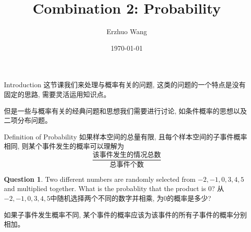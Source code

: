 \documentclass{beamer}
\title{Combination 2: Probability}
\institute{Youth STEM Academy}
\author{Erzhuo Wang}
\date{\today}
\theoremstyle{definition}
\newtheorem{ques}[defn]{Question}
\begin{document}
\begin{frame}
    \titlepage
\end{frame}
\begin{frame}{Introduction}
    这节课我们来处理与概率有关的问题, 这类的问题的一个特点是没有固定的思路, 需要灵活运用知识点。 
    
    但是一些与概率有关的经典问题和思想我们需要进行讨论, 如条件概率的思想以及二项分布问题。
\end{frame}
\begin{frame}{Definition of Probability}
    如果样本空间的总量有限, 且每个样本空间的子事件概率相同, 则某个事件发生的概率可以理解为
    $$
      \frac{\text{该事件发生的情况总数}}{\text{总事件个数}}
    $$
    \begin{ques}
        Two different numbers are randomly selected from $-2,-1,0,3,4,5$ and multiplied together. What is the probablity
    that the product is $0$?
    从$-2,-1,0,3,4,5$中随机选择两个不同的数字并相乘, 为0的概率是多少?
    \end{ques}
    如果子事件发生概率不同, 某个事件的概率应该为该事件的所有子事件的概率分别相加。
\end{frame}
\end{document}
